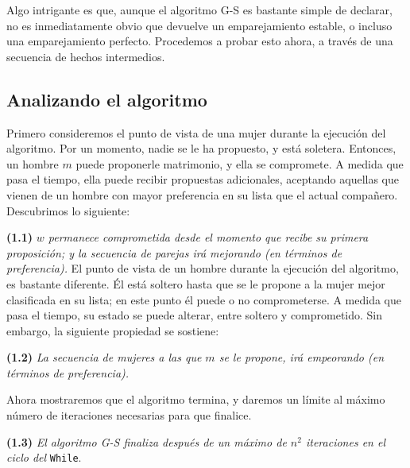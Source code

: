 \documentclass[a4paper, 12pt]{book}
\begin{document}
Algo intrigante es que, aunque el algoritmo G-S es bastante simple de declarar, no es inmediatamente obvio que devuelve un emparejamiento estable, o incluso una emparejamiento perfecto. Procedemos a probar esto ahora, a través de una secuencia de hechos intermedios.

\subsection*{Analizando el algoritmo}  

Primero consideremos el punto de vista de una mujer durante la ejecución del algoritmo. Por un momento, nadie se le ha propuesto, y está soletera. Entonces, un hombre $m$ puede proponerle matrimonio, y ella se compromete. A medida que pasa el tiempo, ella puede recibir propuestas adicionales, aceptando aquellas que vienen de un hombre con mayor preferencia en su lista que el actual compañero. Descubrimos lo siguiente:

\vspace{0.2cm}
%
\noindent\textbf{(1.1)} \textit{$w$ permanece comprometida desde el momento que recibe su primera proposición; y la secuencia de parejas irá mejorando (en términos de preferencia).}
%
\vspace{0.2cm}
%
El punto de vista de un hombre durante la ejecución del algoritmo, es bastante diferente. Él está soltero hasta que se le propone a la mujer mejor clasificada en su lista; en este punto él puede o no comprometerse. A medida que pasa el tiempo, su estado se puede alterar, entre soltero y comprometido. Sin embargo, la siguiente propiedad se sostiene:
\vspace{0.2cm}

\noindent\textbf{(1.2)} \textit{La secuencia de mujeres a las que $m$ se le propone, irá empeorando (en términos de preferencia).}
\vspace{0.2cm}

Ahora mostraremos que el algoritmo termina, y daremos un límite al máximo número de iteraciones necesarias para que finalice.
\vspace{0.2cm}

\noindent\colorbox{mygray}{\parbox{0.98\textwidth}{\textbf{(1.3)} \textit{El algoritmo G-S finaliza después de un máximo de $n^2$ iteraciones en el ciclo del} \texttt{While}.}}

\vspace{0.2cm}
\end{document}

